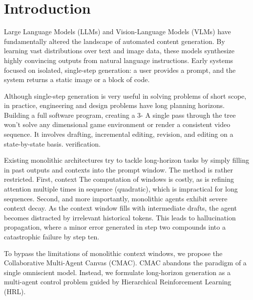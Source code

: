 \documentclass[pdflatex,sn-mathphys-num]{sn-jnl}
\begin{document}

\maketitle

\section{Introduction}
Large Language Models (LLMs) and Vision-Language Models (VLMs) have fundamentally altered the landscape of automated content generation. By learning vast distributions over text and image data, these models synthesize highly convincing outputs from natural language instructions. Early systems focused on isolated, single-step generation: a user provides a prompt, and the system returns a static image or a block of code.

Although single-step generation is very useful in solving problems of short scope, in practice, engineering and design problems have long planning horizons. Building a full software program, creating a 3- A single pass through the tree won't solve any dimensional game environment or render a consistent video sequence. It involves drafting, incremental editing, revision, and editing on a state-by-state basis. verification. 

Existing monolithic architectures try to tackle long-horizon tasks by simply filling in past outputs and contexts into the prompt window. The method is rather restricted. First, context The computation of windows is costly, as is refining attention multiple times in sequence (quadratic), which is impractical for long sequences. Second, and more importantly, monolithic agents exhibit severe context decay. As the context window fills with intermediate drafts, the agent becomes distracted by irrelevant historical tokens. This leads to hallucination propagation, where a minor error generated in step two compounds into a catastrophic failure by step ten.

To bypass the limitations of monolithic context windows, we propose the Collaborative Multi-Agent Canvas (CMAC). CMAC abandons the paradigm of a single omniscient model. Instead, we formulate long-horizon generation as a multi-agent control problem guided by Hierarchical Reinforcement Learning (HRL). 
\end{document}
